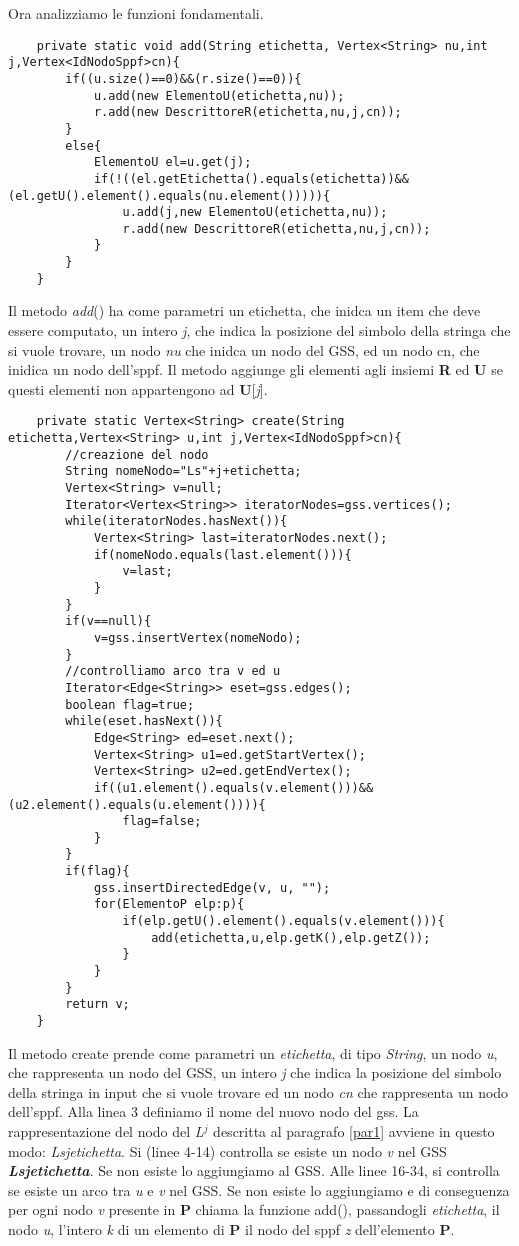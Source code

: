 Ora analizziamo le funzioni fondamentali.
\begin{lstlisting}
	private static void add(String etichetta, Vertex<String> nu,int j,Vertex<IdNodoSppf>cn){
		if((u.size()==0)&&(r.size()==0)){
			u.add(new ElementoU(etichetta,nu));
			r.add(new DescrittoreR(etichetta,nu,j,cn));
		}
		else{
			ElementoU el=u.get(j);
			if(!((el.getEtichetta().equals(etichetta))&&(el.getU().element().equals(nu.element())))){
				u.add(j,new ElementoU(etichetta,nu));
				r.add(new DescrittoreR(etichetta,nu,j,cn));
			}
		}
	}
\end{lstlisting}
Il metodo \textit{add}() ha come parametri un etichetta, che inidca un item che deve essere computato, un intero \textit{j}, che indica la posizione del simbolo della stringa che si vuole trovare, un nodo \textit{nu} che inidca un nodo del GSS, ed un nodo cn, che inidica un nodo dell'sppf. Il metodo aggiunge gli elementi agli insiemi \textbf{R} ed \textbf{U} se questi elementi non appartengono ad \textbf{U}[\textit{j}].
\begin{lstlisting}
	private static Vertex<String> create(String etichetta,Vertex<String> u,int j,Vertex<IdNodoSppf>cn){
		//creazione del nodo
		String nomeNodo="Ls"+j+etichetta;
		Vertex<String> v=null;
		Iterator<Vertex<String>> iteratorNodes=gss.vertices();
		while(iteratorNodes.hasNext()){
			Vertex<String> last=iteratorNodes.next();
			if(nomeNodo.equals(last.element())){
				v=last;
			}
		}
		if(v==null){
			v=gss.insertVertex(nomeNodo);
		}
		//controlliamo arco tra v ed u
		Iterator<Edge<String>> eset=gss.edges();
		boolean flag=true;
		while(eset.hasNext()){
			Edge<String> ed=eset.next();
			Vertex<String> u1=ed.getStartVertex();
			Vertex<String> u2=ed.getEndVertex();
			if((u1.element().equals(v.element()))&&(u2.element().equals(u.element()))){
				flag=false;
			}
		}
		if(flag){
			gss.insertDirectedEdge(v, u, "");
			for(ElementoP elp:p){
				if(elp.getU().element().equals(v.element())){
					add(etichetta,u,elp.getK(),elp.getZ());
				}
			}
		}
		return v;
	}
\end{lstlisting}
Il metodo create prende come parametri un \textit{etichetta}, di tipo \textit{String}, un nodo \textit{u}, che rappresenta un nodo del GSS, un intero \textit{j} che indica la posizione del simbolo della stringa in input che si vuole trovare ed un nodo \textit{cn} che rappresenta un nodo dell'sppf. Alla linea 3 definiamo il nome del nuovo nodo del gss. La rappresentazione del nodo del \textit{L}$^{j}$ descritta al paragrafo \ref{par1} avviene in questo modo: \textit{Ls}\textit{j}\textit{etichetta}. Si (linee 4-14) controlla se esiste un nodo \textit{v} nel GSS \textbf{\textit{Ls}\textit{j}\textit{etichetta}}. Se non esiste lo aggiungiamo al GSS. Alle linee 16-34, si controlla se esiste un arco tra \textit{u} e \textit{v} nel GSS. Se non esiste lo aggiungiamo e di conseguenza per ogni nodo \textit{v} presente in \textbf{P} chiama la funzione add(), passandogli \textit{etichetta}, il nodo \textit{u}, l'intero \textit{k} di un elemento di \textbf{P} il nodo del sppf \textit{z} dell'elemento \textbf{P}.
